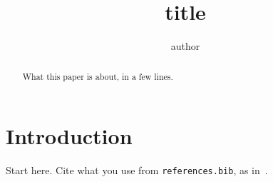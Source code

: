 \documentclass[11pt]{amsart}
\title{{{title}}}
\author{{{author}}}
\theoremstyle{definition}
\theoremstyle{remark}
\begin{document}
\begin{abstract}
  What this paper is about, in a few lines.
\end{abstract}

\maketitle

\section{Introduction}

Start here. Cite what you use from \texttt{references.bib}, as
in~\cite{example}.



\end{document}
